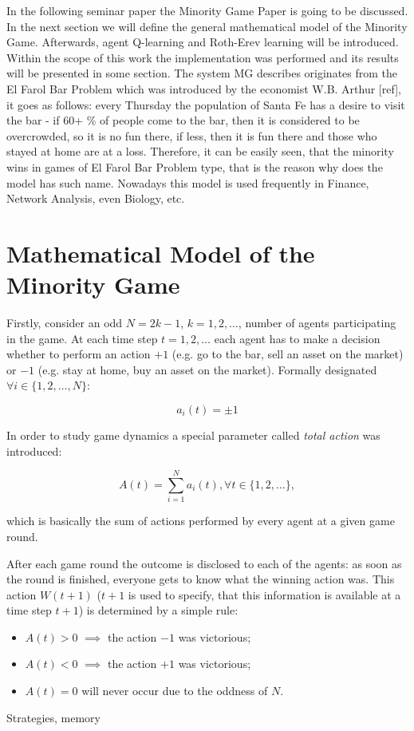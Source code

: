 \documentclass[11pt,american,czech]{article}
\begin{document}
In the following seminar paper the Minority Game Paper is going to be discussed. In the next section we will define the general mathematical model of the Minority Game. Afterwards, agent Q-learning and Roth-Erev learning will be introduced. Within the scope of this work the implementation was performed and its results will be presented in some section. 
The system MG describes originates from the El Farol Bar Problem which was introduced by the economist W.B. Arthur [ref], it goes as follows: every Thursday the population of Santa Fe has a desire to visit the bar - if 60+ \%  of people come to the bar, then it is considered to be overcrowded, so it is no fun there, if less, then it is fun there and those who stayed at home are at a loss. Therefore, it can be easily seen, that the minority wins in games of El Farol Bar Problem type, that is the reason why does the model has such name. Nowadays this model is used frequently in Finance, Network Analysis, even Biology, etc.

\section{Mathematical Model of the Minority Game}

Firstly, consider an odd $N=2k-1$, $k=1,2,\dots$, number of agents participating in the game. At each time step $t=1,2,\dots$ each agent has to make a decision whether to perform an action $+1$ (e.g. go to the bar, sell an asset on the market) or $-1$ (e.g. stay at home, buy an asset on the market). Formally designated $\forall i\in\{1,2,\dots,N\}$:

\begin{equation}
a_{i}(t)=\pm 1
\end{equation}

In order to study game dynamics a special parameter called \textit{total action} was introduced: 

\begin{equation}
A(t)=\sum_{i=1}^{N}a_{i}(t), \forall t\in\{1,2,\dots\},
\end{equation}

\noindent
which is basically the sum of actions performed by every agent at a given game round.

\medskip

After each game round the outcome is disclosed to each of the agents: as soon as the round is finished, everyone gets to know what the winning action was. This action $W(t+1)$ ($t+1$ is used to specify, that this information is available at a time step $t+1$) is determined by a simple rule:

\begin{itemize}
\item $A(t)>0$ $\implies$ the action $-1$ was victorious;
\item $A(t)<0$ $\implies$ the action $+1$ was victorious;
\item $A(t)=0$ will never occur due to the oddness of $N$.
\end{itemize} 


Strategies, memory

\newpage{}



%

\end{document}
